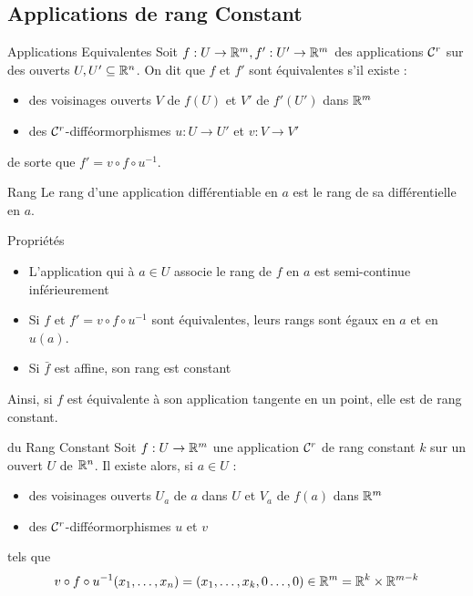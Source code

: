 \documentclass{cours}
\begin{document}
\subsection{Applications de rang Constant}
\begin{définition}{Applications Equivalentes}{}
    Soit $f : U \to \mathbb{R}^{m}, f' : U'\to \mathbb{R}^{m}$ des applications $\mathcal{C}^{r}$ sur des ouverts $U, U' \subseteq \mathbb{R}^{n}$. On dit que $f$ et $f'$ sont équivalentes s'il existe : 
    \begin{itemize}
        \item des voisinages ouverts $V$ de $f(U)$ et $V'$ de $f'(U')$ dans $\mathbb{R}^{m}$ 
        \item des $\mathcal{C}^{r}$-difféormorphismes $u : U \to U'$ et $v : V \to V'$
    \end{itemize}
    de sorte que $f' = v\circ f \circ u^{-1}$.
\end{définition}

\begin{définition}{Rang}{}
    Le rang d'une application différentiable en $a$ est le rang de sa différentielle en $a$. 
\end{définition}
\begin{propositionfr}{Propriétés}{}
    \begin{itemize}
        \item L'application qui à $a \in U$ associe le rang de $f$ en $a$ est semi-continue inférieurement
        \item Si $f$ et $f' = v \circ f \circ u^{-1}$ sont équivalentes, leurs rangs sont égaux en $a$ et en $u(a)$.
        \item Si $\bar{f}$ est affine, son rang est constant
    \end{itemize}
    Ainsi, si $f$ est équivalente à son application tangente en un point, elle est de rang constant.
\end{propositionfr}

\begin{théorème}{du Rang Constant}{}
    Soit $f : U \to \mathbb{R}^{m}$ une application $\mathcal{C}^{r}$ de rang constant $k$ sur un ouvert $U$ de $\mathbb{R}^{n}$. Il existe alors, si $a \in U$ : 
    \begin{itemize}
        \item des voisinages ouverts $U_a$ de $a$ dans $U$ et $V_a$ de $f(a)$ dans $\mathbb{R}^{m}$
        \item des $\mathcal{C}^{r}$-difféormorphismes $u$ et $v$
    \end{itemize}
    tels que 
    \[
        v \circ f \circ u^{-1}(x_{1}, \ldots, x_{n}) = \left(x_{1}, \ldots, x_{k}, 0 \ldots, 0\right) \in \mathbb{R}^{m} = \mathbb{R}^{k} \times \mathbb{R}^{m - k}
    \]
\end{théorème}
\end{document}
